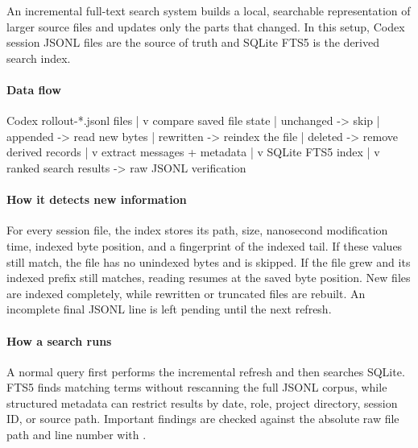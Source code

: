 

An incremental full-text search system builds a local, searchable representation of larger source files and updates only the parts that changed.
In this setup, Codex session JSONL files are the source of truth and SQLite FTS5 is the derived search index.

\paragraph{Data flow}
\begin{DocCode}
Codex rollout-*.jsonl files
          |
          v
compare saved file state
  | unchanged  -> skip
  | appended   -> read new bytes
  | rewritten  -> reindex the file
  | deleted    -> remove derived records
          |
          v
extract messages + metadata
          |
          v
SQLite FTS5 index
          |
          v
ranked search results -> raw JSONL verification
\end{DocCode}

\paragraph{How it detects new information}
For every session file, the index stores its path, size, nanosecond modification time, indexed byte position, and a fingerprint of the indexed tail.
If these values still match, the file has no unindexed bytes and is skipped.
If the file grew and its indexed prefix still matches, reading resumes at the saved byte position.
New files are indexed completely, while rewritten or truncated files are rebuilt.
An incomplete final JSONL line is left pending until the next refresh.

\paragraph{How a search runs}
A normal  query first performs the incremental refresh and then searches SQLite.
FTS5 finds matching terms without rescanning the full JSONL corpus, while structured metadata can restrict results by date, role, project directory, session ID, or source path.
Important findings are checked against the absolute raw file path and line number with .

